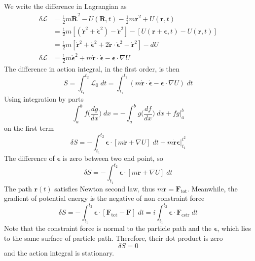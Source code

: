 \documentclass[../../../main.tex]{subfiles}
\begin{document}
We write the difference in Lagrangian as
\begin{align*}
	\delta \mathcal{L} & =\frac{1}{2}m\dot{\mathbf{R}}^2-U(\mathbf{R},t)-\frac{1}{2}m\dot{\mathbf{r}}^2+U(\mathbf{r},t)                                                                     \\
	                   & =\frac{1}{2}m\left[(\dot{\mathbf{r}}^2+\dot{\boldsymbol{\epsilon}}^2)-\dot{\mathbf{r}}^2\right]-\left[U(\mathbf{r}+\boldsymbol{\epsilon},t)-U(\mathbf{r},t)\right] \\
	                   & =\frac{1}{2}m\left[\dot{\mathbf{r}}^2+\dot{\boldsymbol{\epsilon}}^2+2\dot{\mathbf{r}}\cdot\dot{\boldsymbol{\epsilon}}^2-\dot{\mathbf{r}}^2\right]-dU               \\
	\delta\mathcal{L}  & =\frac{1}{2}m\dot{\boldsymbol{\epsilon}}^2+m\dot{\mathbf{r}}\cdot\dot{\boldsymbol{\epsilon}}-{\boldsymbol{\epsilon}}\cdot \nabla U
\end{align*}
The difference in action integral, in the first order, is then
\begin{equation*}
	S=\int_{t_1}^{t_2}\mathcal{L}_0\;dt=\int_{t_1}^{t_2}\left(m\dot{\mathbf{r}}\cdot\dot{\boldsymbol{\epsilon}}-\boldsymbol{\epsilon}\cdot\nabla U\right)\;dt
\end{equation*}
Using integration by parts
\begin{equation*}
	\int_{a}^{b} f\bigg(\frac{dg}{dx}\bigg)\;dx=-\int_{a}^{b} g\bigg(\frac{df}{dx}\bigg)\;dx+ fg \bigg\lvert_{a}^{b}
\end{equation*}
on the first term
\begin{equation*}
	\delta S=-\int_{t_1}^{t_2}\boldsymbol{\epsilon}\cdot\left[m\ddot{\mathbf{r}}+\nabla U\right]\;dt+m\dot{\mathbf{r}}\boldsymbol{\epsilon}\bigg|_{t_1}^{t^2}
\end{equation*}
The difference of $\boldsymbol{\epsilon}$ is zero between two end point, so 
\begin{equation*}
	\delta S=-\int_{t_1}^{t_2}\boldsymbol{\epsilon}\cdot\left[m\ddot{\mathbf{r}}+\nabla U\right]\;dt
\end{equation*}
The path $\mathbf{r}(t)$ satisﬁes Newton second law, thus $m\ddot{\mathbf{r}}=\mathbf{F}_\text{tot}$. 
Meanwhile, the gradient of potential energy is the negative of non constraint force
\begin{equation*}
	\delta S=-\int_{t_1}^{t_2}\boldsymbol{\epsilon}\cdot\left[\mathbf{F}_\text{tot}-\mathbf{F}\right]\;dt=i\int_{t_1 }^{t_2}\boldsymbol{\epsilon}\cdot \mathbf{F}_\text{cstr}\;dt
\end{equation*}
Note that the constraint force is normal to the particle path and the $\boldsymbol{\epsilon}$, which lies to the same surface of particle path. 
Therefore, their dot product is zero 
\begin{equation*}
  \delta S=0
\end{equation*}
and the action integral is stationary.
\end{document}
